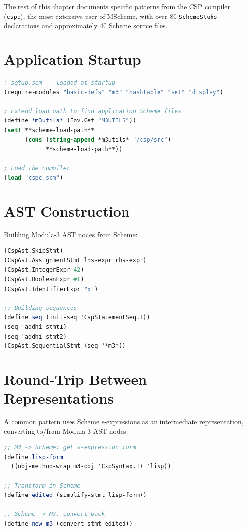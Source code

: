 \documentclass[12pt]{report}
\begin{document}
\bigskip
The rest of this chapter documents specific patterns from the CSP
compiler ({\tt cspc}), the most extensive user of MScheme, with over
80 {\tt SchemeStubs} declarations and approximately 40 Scheme source
files.

\section{Application Startup}

\begin{lstlisting}[language=Scheme]
; setup.scm -- loaded at startup
(require-modules "basic-defs" "m3" "hashtable" "set" "display")

; Extend load path to find application Scheme files
(define *m3utils* (Env.Get "M3UTILS"))
(set! **scheme-load-path**
      (cons (string-append *m3utils* "/csp/src")
            **scheme-load-path**))

; Load the compiler
(load "cspc.scm")
\end{lstlisting}

\section{AST Construction}

Building Modula-3 AST nodes from Scheme:

\begin{lstlisting}[language=Scheme]
(CspAst.SkipStmt)
(CspAst.AssignmentStmt lhs-expr rhs-expr)
(CspAst.IntegerExpr 42)
(CspAst.BooleanExpr #t)
(CspAst.IdentifierExpr "x")

;; Building sequences
(define seq (init-seq 'CspStatementSeq.T))
(seq 'addhi stmt1)
(seq 'addhi stmt2)
(CspAst.SequentialStmt (seq '*m3*))
\end{lstlisting}

\section{Round-Trip Between Representations}

A common pattern uses Scheme s-expressions as an intermediate
representation, converting to/from Modula-3 AST nodes:

\begin{lstlisting}[language=Scheme]
;; M3 -> Scheme: get s-expression form
(define lisp-form
  ((obj-method-wrap m3-obj 'CspSyntax.T) 'lisp))

;; Transform in Scheme
(define edited (simplify-stmt lisp-form))

;; Scheme -> M3: convert back
(define new-m3 (convert-stmt edited))
\end{lstlisting}
\end{document}
